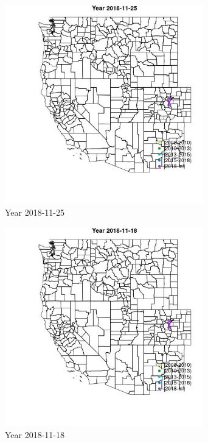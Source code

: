 \begin{figure} 
\centering  
\includegraphics[width=0.77\textwidth]{Code_Outputs/Report_ML_input_PM25_Step4_part_e_de_duplicated_aveswNAs_MapObsYear2018-11-25.jpg} 
\caption{\label{fig:Report_ML_input_PM25_Step4_part_e_de_duplicated_aveswNAsMapObsYear2018-11-25}Year 2018-11-25} 
\end{figure} 
 

\begin{figure} 
\centering  
\includegraphics[width=0.77\textwidth]{Code_Outputs/Report_ML_input_PM25_Step4_part_e_de_duplicated_aveswNAs_MapObsYear2018-11-18.jpg} 
\caption{\label{fig:Report_ML_input_PM25_Step4_part_e_de_duplicated_aveswNAsMapObsYear2018-11-18}Year 2018-11-18} 
\end{figure} 
 

